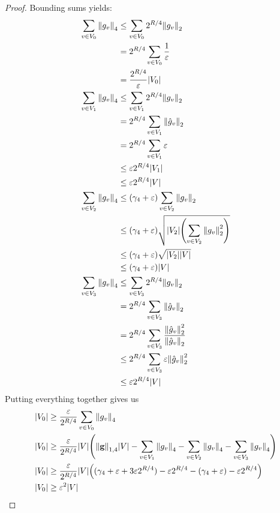 \documentclass[10pt]{article}
\newcommand{\mbf}[1]{\mathbf{ #1 }}
\begin{document}
\begin{proof}
Bounding sums yields:
\begin{align*}
    \sum_{v \in V_0} \norm{g_v}_4 &\leq \sum_{v \in V_0} 2^{R/4} \norm{g_v}_2
    \\ &= 2^{R/4} \sum_{v \in V_0} \frac{1}{\varepsilon}
    \\ &= \frac{2^{R/4}}{\varepsilon} \abs{V_0}
    \\ 
    \sum_{v \in V_1} \norm{g_v}_4 &\leq \sum_{v \in V_1} 2^{R/4} \norm{g_v}_2
    \\ &= 2^{R/4} \sum_{v \in V_1} \norm{\hat{g}_v}_2
    \\ &= 2^{R/4} \sum_{v \in V_1} \varepsilon
    \\ &\leq \varepsilon 2^{R/4} \abs{V_1} 
    \\ &\leq \varepsilon 2^{R/4} \abs{V}
    \\ 
    \sum_{v \in V_2} \norm{g_v}_4 &\leq (\gamma_4 + \varepsilon) \sum_{v \in V_2} \norm{g_v}_2
    \\ &\leq (\gamma_4 + \varepsilon) \sqrt{\abs{V_2} \qty(\sum_{v \in V_2} \norm{g_v}_2^2)}
    \\ &\leq (\gamma_4 + \varepsilon) \sqrt{\abs{V_2} \abs{V}}
    \\ &\leq (\gamma_4 + \varepsilon) \abs{V}
    \\ 
    \sum_{v \in V_3} \norm{g_v}_4 &\leq \sum_{v \in V_3} 2^{R/4} \norm{g_v}_2
    \\ &= 2^{R/4} \sum_{v \in V_3} \norm{\hat{g}_v}_2
    \\ &= 2^{R/4} \sum_{v \in V_3} \frac{\norm{\hat{g}_v}_2^2}{\norm{\hat{g}_v}_2}
    \\ &\leq 2^{R/4} \sum_{v \in V_3} \varepsilon \norm{\hat{g}_v}_2^2
    \\ &\leq \varepsilon 2^{R/4} \abs{V}
\end{align*}
Putting everything together gives us
\begin{align*}
    \abs{V_0} &\geq \frac{\varepsilon}{2^{R/4}} \sum_{v \in V_0} \norm{g_v}_4
    \\ 
    \abs{V_0} &\geq \frac{\varepsilon}{2^{R/4}} \abs{V} \qty(\norm{\mbf{g}}_{1, 4} |V| -  \sum_{v \in V_1} \norm{g_v}_4 - \sum_{v \in V_2} \norm{g_v}_4 - \sum_{v \in V_3} \norm{g_v}_4)
    \\ \abs{V_0} &\geq \frac{\varepsilon}{2^{R/4}} \abs{V} \qty((\gamma_4 + \varepsilon + 3 \varepsilon 2^{R/4}) - \varepsilon 2^{R/4} - (\gamma_4 + \varepsilon) - \varepsilon 2^{R/4})\\
    \abs{V_0} &\geq \varepsilon^2 |V|
\end{align*}
\end{proof}
\end{document}
